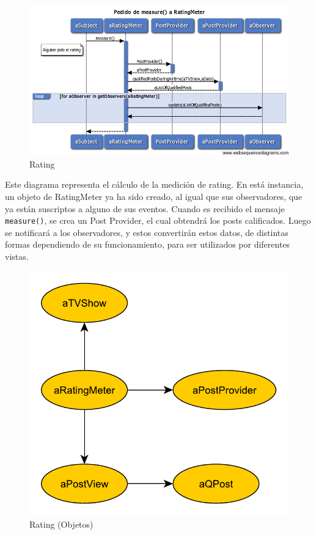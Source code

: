 \begin{figure}[H]
\centering
\includegraphics[scale=0.6]{graph/diagramas_secuencia/Rating.png}
\caption{Rating}
\end{figure}

Este diagrama representa el cálculo de la medición de rating. En está instancia, un objeto de RatingMeter ya ha sido creado, al igual que sus observadores, que ya están suscriptos a alguno de sus eventos. Cuando es recibido el mensaje \texttt{measure()}, se crea un Post Provider, el cual obtendrá los posts calificados. Luego se notificará a los observadores, y estos convertirán estos datos, de distintas formas dependiendo de su funcionamiento, para ser utilizados por diferentes vistas.

\begin{figure}[H]
\centering
\includegraphics[scale=0.7]{graph/objetos/Rating.pdf}
\caption{Rating (Objetos)}
\end{figure}
